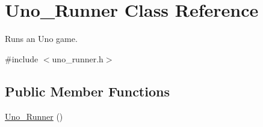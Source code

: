 \hypertarget{class_uno___runner}{
\section{\-Uno\-\_\-\-Runner \-Class \-Reference}
\label{class_uno___runner}
}


\-Runs an \-Uno game.  




{\ttfamily \#include $<$uno\-\_\-runner.\-h$>$}

\subsection*{\-Public \-Member \-Functions}
\begin{DoxyCompactItemize}
\item 
\hypertarget{class_uno___runner_a485bf9506331363e4b0d6208ee446497}{
\hyperlink{class_uno___runner_a485bf9506331363e4b0d6208ee446497}{\-Uno\-\_\-\-Runner} ()}
\label{class_uno___runner_a485bf9506331363e4b0d6208ee446497}


\end{DoxyCompactItemize}
